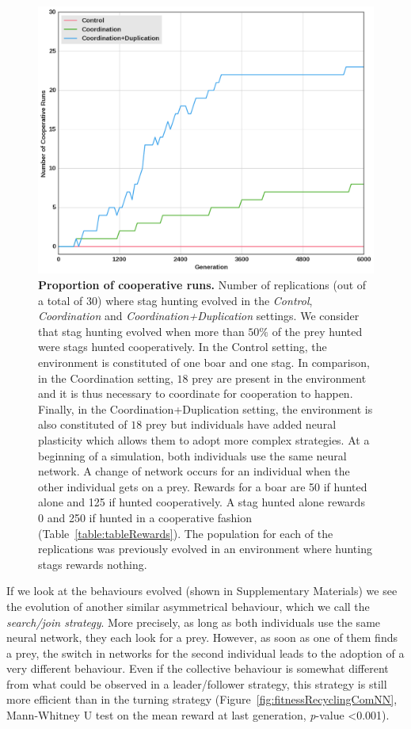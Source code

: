     \begin{figure}[h]
      \centering
        \includegraphics[width=0.7\linewidth]{fig/ArticleBio2/Fig7.png}
        \caption{\textbf{Proportion of cooperative runs.}
        Number of replications (out of a total of $30$) where stag hunting evolved in the \emph{Control}, \emph{Coordination} and \emph{Coordination+Duplication} settings. We consider that stag hunting evolved when more than $50\%$ of the prey hunted were stags hunted cooperatively. In the Control setting, the environment is constituted of one boar and one stag. In comparison, in the Coordination setting, $18$ prey are present in the environment and it is thus necessary to coordinate for cooperation to happen. Finally, in the Coordination+Duplication setting, the environment is also constituted of $18$ prey but individuals have added neural plasticity which allows them to adopt more complex strategies. At a beginning of a simulation, both individuals use the same neural network. A change of network occurs for an individual when the other individual gets on a prey. Rewards for a boar are 50 if hunted alone and 125 if hunted cooperatively. A stag hunted alone rewards 0 and 250 if hunted in a cooperative fashion (Table~\ref{table:tableRewards}). The population for each of the replications was previously evolved in an environment where hunting stags rewards nothing.}
      \label{fig:figRecyclingComNN}
    \end{figure}

    If we look at the behaviours evolved (shown in Supplementary Materials) we see the evolution of another similar asymmetrical behaviour, which we call the \emph{search/join strategy}. More precisely, as long as both individuals use the same neural network, they each look for a prey. However, as soon as one of them finds a prey, the switch in networks for the second individual leads to the adoption of a very different behaviour. Even if the collective behaviour is somewhat different from what could be observed in a leader/follower strategy, this strategy is still more efficient than in the turning strategy (Figure~\ref{fig:fitnessRecyclingComNN}, Mann-Whitney U test on the mean reward at last generation, {\em p}-value \textless 0.001).

